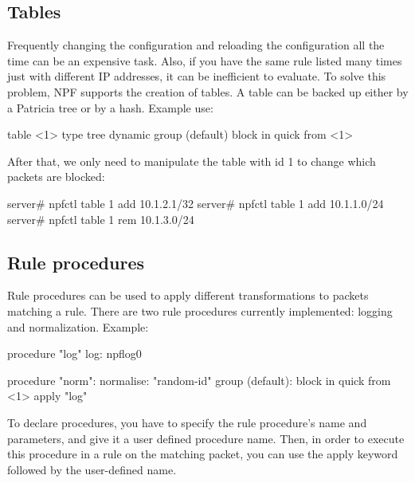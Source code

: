 \documentclass[11pt,twocolumn]{article}
\begin{document}
\subsection{Tables}
Frequently changing the configuration and reloading the configuration all the time can be an expensive
task. Also, if you have the same rule listed many times just with different IP addresses, it can be inefficient
to evaluate. To solve this problem, NPF supports the creation of tables. A table can be backed up either by a
Patricia tree or by a hash. Example use:
\begin{verbatimtab}[8]
table <1> type tree dynamic
group (default) {
	block in quick from <1>
}
\end{verbatimtab}
After that, we only need to manipulate the table with id 1 to change which packets are blocked:
\begin{verbatimtab}[8]
server# npfctl table 1 add 10.1.2.1/32
server# npfctl table 1 add 10.1.1.0/24
server# npfctl table 1 rem 10.1.3.0/24
\end{verbatimtab}

\subsection{Rule procedures}
Rule procedures can be used to apply different transformations to packets matching a rule.
There are two rule procedures currently implemented: logging and normalization.
Example:
\begin{verbatimtab}[8]
procedure "log" {
	log: npflog0
}

procedure "norm": {
	normalise: "random-id"
}
group (default):
	block in quick from <1> apply "log"
\end{verbatimtab}
To declare procedures, you have to specify the rule procedure's name and parameters, and give
it a user defined procedure name. Then, in order to execute this procedure in a rule on the matching packet,
you can use the apply keyword followed by the user-defined name.
\end{document}
